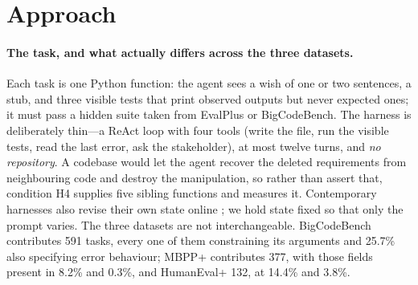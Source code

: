 \documentclass{article}
\title{%
    #1\\[0.7em]
    {\normalsize\normalfont
      Columbia COMS 4705 Project Milestone
    }\\[0.8em]
    \parbox{0.95\textwidth}{%
      \normalfont\small\centering

      \textbf{Keywords:} \textit{#2}
      \par\vspace{0.4em}

      \textbf{TA Mentor:} #3%

      \if\relax\detokenize{#4}\relax\else
        \par\vspace{0.4em}
        \textbf{External Collaborators:} #4%
      \fi

      \if\relax\detokenize{#5}\relax\else
        \par\vspace{0.4em}
        \textbf{Sharing Project:} #5%
      \fi
      \par
    }%
  }%
\author{
  Yanhao Bai \quad Kaitlyn Bassford \quad Wen Tao Koh \\
  Department of Computer Science, Columbia University \\
  \texttt{\{yb2630, kmb2297, wk2439\}@columbia.edu}
}
\begin{document}
\maketitle

\begin{abstract}
Wish-driven programming---stating an intent and letting an agent build the artifact---fails
quietly: the program runs, passes the tests the user remembered to mention, and violates a
requirement nobody wrote down. We degrade benchmark specifications into wishes by deleting
fields mechanically, and train a small \emph{silence detector} that predicts which requirement
categories a wish leaves implicit and uses that ranking to choose which clarifying question to
ask. On 100 development tasks with Qwen3-8B, targeted questioning reaches 53.7\% against 44.3\%
for generic questioning at the same budget and 42.7\% when the same answers are withheld, while
a harness that may read neighbouring code reaches 51.7\%.
\end{abstract}

\clearpage

\section{Approach}

\paragraph{The task, and what actually differs across the three datasets.}
Each task is one Python function: the agent sees a wish of one or two sentences, a stub, and
three visible tests that print observed outputs but never expected ones; it must pass a hidden
suite taken from EvalPlus \citep{liu2023evalplus} or BigCodeBench. The harness is deliberately
thin---a ReAct loop with four tools (write the file, run the visible tests, read the last
error, ask the stakeholder), at most twelve turns, and \emph{no repository}. A codebase would
let the agent recover the deleted requirements from neighbouring code and destroy the
manipulation, so rather than assert that, condition H4 supplies five sibling functions and
measures it. Contemporary harnesses also revise their own state online \citep{xiao2026reharness};
we hold state fixed so that only the prompt varies. The three datasets are not interchangeable. BigCodeBench contributes 591 tasks, every one of
them constraining its arguments and 25.7\% also specifying error behaviour; MBPP+ contributes
377, with those fields present in 8.2\% and 0.3\%, and HumanEval+ 132, at 14.4\% and 3.8\%.
\end{document}

